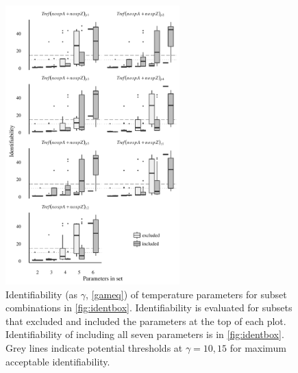 \documentclass[letterpaper,12pt,oneside]{article}\usepackage[]{graphicx}\usepackage[]{color}
\begin{document}
\begin{figure}[!ht]

{\centering \includegraphics[width=0.6\textwidth]{figs/excltemp-1} 

}

\caption{Identifiability (as $\gamma$, \cref{gameq}) of temperature parameters for subset combinations in \cref{fig:identbox}.  Identifiability is evaluated for subsets that excluded and included the parameters at the top of each plot. Identifiability of including all seven parameters is in \cref{fig:identbox}. Grey lines indicate potential thresholds at $\gamma = 10, 15$ for maximum acceptable identifiability.}\label{fig:excltemp}
\end{figure}
\end{document}
